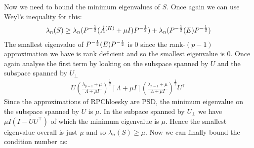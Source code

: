 Now we need to bound the minimum eigenvalues of $S$. Once again we can use Weyl's inequality for this:
\begin{align*}
    \lambda_n(S) \geq \lambda_n(P^{-\frac{1}{2}} (\hat{A}^{(K)} + \mu I) P^{-\frac{1}{2}}) + \lambda_n(P^{-\frac{1}{2}} (E) P^{-\frac{1}{2}})
\end{align*}
The smallest eigenvalue of $P^{-\frac{1}{2}} (E) P^{-\frac{1}{2}}$ is 0 since the rank-$(p-1)$ approximation we have is rank deficient and so
the smallest eigenvalue is 0. Once again analyse the first term by looking on the subspace spanned by $U$ and the
subspace spanned by $U_{\perp}$ 
\begin{align*}
    U(\frac{\lambda_{p-1} + \mu}{\Lambda + \mu I})^{\frac{1}{2}}[\Lambda + \mu I](\frac{\lambda_{p-1} + \mu}{\Lambda + \mu I})^{\frac{1}{2}}U^{\top}
\end{align*}
Since the approximations of RPChloesky are PSD, the minimum eigenvalue on the subspace spanned by $U$ is $\mu$. In the
subpace spanned by $U_{\perp}$ we have $\mu I(I-UU^{\top})$ of which the minimum eigenvalue is $\mu$. Hence the smallest
eigenvalue overall is just $\mu$ and so $\lambda_n(S) \geq \mu$. Now we can finally bound the condition number as:

